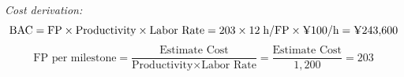 \documentclass[12pt,a4paper]{article}
\newcommand{\yen}{\ifmmode\mbox{\textyen}\else\textyen\fi}
\begin{document}
\bigskip
\noindent\textit{Cost derivation:}
\[
  \text{BAC} = \text{FP} \times \text{Productivity} \times \text{Labor Rate}
             = 203 \times 12 \;\text{h/FP} \times \yen100/\text{h}
             = \yen243{,}600
\]
\[
  \text{FP per milestone} = \frac{\text{Estimate Cost}}{\text{Productivity} \times \text{Labor Rate}}
                          = \frac{\text{Estimate Cost}}{1{,}200}
                          =
                           {203}
\]

\bigskip

\end{document}
